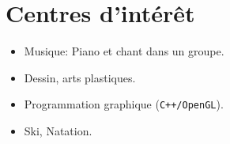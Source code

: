 \section*{Centres d'intérêt}
	\begin{itemize}
		\item{Musique:} Piano et chant dans un groupe.
		\item{Dessin, arts plastiques}.
		\item{Programmation} graphique (\texttt{C++/OpenGL}).
		\item Ski, Natation.
	\end{itemize}




